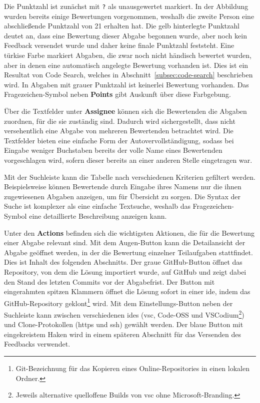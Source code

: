 Die Punktzahl ist zunächst mit \texttt{?} als unausgewertet markiert.
In der Abbildung wurden bereits einige Bewertungen vorgenommen, weshalb die zweite Person eine abschließende Punktzahl von 21 erhalten hat.
Die gelb hinterlegte Punktzahl deutet an, dass eine Bewertung dieser Abgabe begonnen wurde, aber noch kein Feedback versendet wurde und daher keine finale Punktzahl feststeht.
Eine türkise Farbe markiert Abgaben, die zwar noch nicht händisch bewertet wurden, aber in denen eine automatisch angelegte Bewertung vorhanden ist.
Dies ist ein Resultat von Code Search, welches in Abschnitt~\ref{subsec:code-search} beschrieben wird.
In Abgaben mit grauer Punktzahl ist keinerlei Bewertung vorhanden.
Das Fragezeichen-Symbol neben \textbf{Points} gibt Auskunft über diese Farbgebung.

Über die Textfelder unter \textbf{Assignee} können sich die Bewertenden die Abgaben zuordnen, für die sie zuständig sind.
Dadurch wird sichergestellt, dass nicht versehentlich eine Abgabe von mehreren Bewertenden betrachtet wird.
Die Textfelder bieten eine einfache Form der Autovervollständigung, sodass bei Eingabe weniger Buchstaben bereits der volle Name eines Bewertenden vorgeschlagen wird, sofern dieser bereits an einer anderen Stelle eingetragen war.

Mit der Suchleiste kann die Tabelle nach verschiedenen Kriterien gefiltert werden.
Beispielsweise können Bewertende durch Eingabe ihres Namens nur die ihnen zugewiesenen Abgaben anzeigen, um für Übersicht zu sorgen.
Die Syntax der Suche ist komplexer als eine einfache Textsuche, weshalb das Fragezeichen-Symbol eine detaillierte Beschreibung anzeigen kann.

Unter den \textbf{Actions} befinden sich die wichtigsten Aktionen, die für die Bewertung einer Abgabe relevant sind.
Mit dem Augen-Button kann die Detailansicht der Abgabe geöffnet werden, in der die Bewertung einzelner Teilaufgaben stattfindet.
Dies ist Inhalt des folgenden Abschnitts.
Der graue GitHub-Button öffnet das Repository, von dem die Lösung importiert wurde, auf GitHub und zeigt dabei den Stand des letzten Commits vor der Abgabefrist.
Der Button mit eingerahmten spitzen Klammern öffnet die Lösung sofort in einer \ac{ide}, indem das GitHub-Repository geklont\footnote{
    Git-Bezeichnung für das Kopieren eines Online-Repositories in einen lokalen Ordner.
} wird.
Mit dem Einstellungs-Button neben der Suchleiste kann zwischen verschiedenen \acp{ide} (\ac{vsc}, Code-OSS und VSCodium\footnote{
    Jeweils alternative quelloffene Builds von \ac{vsc} ohne Microsoft-Branding.
}) und Clone-Protokollen (\acs{https} und \acs{ssh}) gewählt werden.
Der blaue Button mit eingekreistem Haken wird in einem späteren Abschnitt für das Versenden des Feedbacks verwendet.

